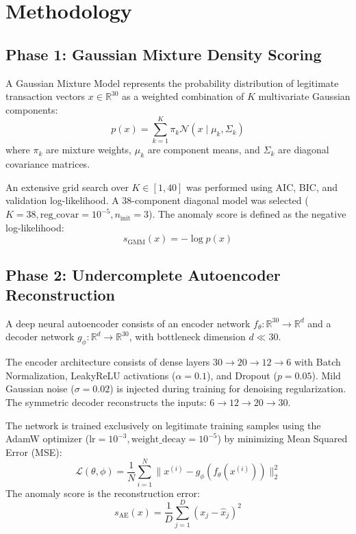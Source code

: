 \documentclass[conference]{IEEEtran}
\begin{document}
\section{Methodology}

\subsection{Phase 1: Gaussian Mixture Density Scoring}
A Gaussian Mixture Model represents the probability distribution of legitimate transaction vectors $x \in \mathbb{R}^{30}$ as a weighted combination of $K$ multivariate Gaussian components:
\begin{equation}
p(x) = \sum_{k=1}^K \pi_k \mathcal{N}(x \mid \mu_k, \Sigma_k)
\end{equation}
where $\pi_k$ are mixture weights, $\mu_k$ are component means, and $\Sigma_k$ are diagonal covariance matrices.

An extensive grid search over $K \in [1, 40]$ was performed using AIC, BIC, and validation log-likelihood. A 38-component diagonal model was selected ($K=38, \text{reg\_covar}=10^{-5}, n_{\text{init}}=3$). The anomaly score is defined as the negative log-likelihood:
\begin{equation}
s_{\text{GMM}}(x) = -\log p(x)
\end{equation}

\subsection{Phase 2: Undercomplete Autoencoder Reconstruction}
A deep neural autoencoder consists of an encoder network $f_\theta: \mathbb{R}^{30} \to \mathbb{R}^d$ and a decoder network $g_\phi: \mathbb{R}^d \to \mathbb{R}^{30}$, with bottleneck dimension $d \ll 30$.

The encoder architecture consists of dense layers $30 \to 20 \to 12 \to 6$ with Batch Normalization, LeakyReLU activations ($\alpha=0.1$), and Dropout ($p=0.05$). Mild Gaussian noise ($\sigma=0.02$) is injected during training for denoising regularization. The symmetric decoder reconstructs the inputs: $6 \to 12 \to 20 \to 30$.

The network is trained exclusively on legitimate training samples using the AdamW optimizer ($\text{lr}=10^{-3}, \text{weight\_decay}=10^{-5}$) by minimizing Mean Squared Error (MSE):
\begin{equation}
\mathcal{L}(\theta, \phi) = \frac{1}{N} \sum_{i=1}^N \|x^{(i)} - g_\phi(f_\theta(x^{(i)}))\|_2^2
\end{equation}
The anomaly score is the reconstruction error:
\begin{equation}
s_{\text{AE}}(x) = \frac{1}{D} \sum_{j=1}^D (x_j - \hat{x}_j)^2
\end{equation}
\end{document}

